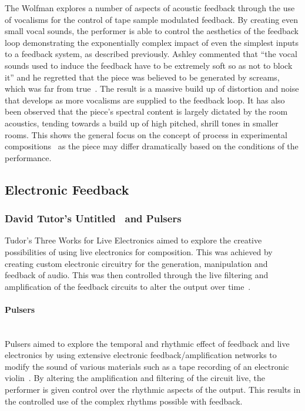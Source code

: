 \documentclass[titlepage]{scrartcl}
\begin{document}
    The Wolfman explores a number of aspects of acoustic feedback through the
    use of vocalisms for the control of tape sample modulated feedback. By
    creating even small vocal sounds, the performer is able to control the
    aesthetics of the feedback loop demonstrating the exponentially complex
    impact of even the simplest inputs to a feedback system, as described
    previously. Ashley commented that ``the vocal sounds used to induce the
    feedback have to be extremely soft so as not to block it'' and he regretted
    that the piece was believed to be generated by screams, which was far from
    true~\parencite[p.37]{gann2012ra}. The result is a massive build up of
    distortion and noise that develops as more vocalisms are supplied to the
    feedback loop. It has also been observed that the piece's spectral content
    is largely dictated by the room acoustics, tending towards a build up of
    high pitched, shrill tones in smaller rooms. This shows the general focus
    on the concept of process in experimental
    compositions~\parencite[p.18]{cage2011silence} as the piece may differ
    dramatically based on the conditions of the performance.

    \subsection{Electronic Feedback}\label{ElecFeed}
    \subsubsection{David Tutor's Untitled~\citeyearpar{tudor1996twfle} and Pulsers~\citeyearpar{tudor1996twfle}}\label{tudor}
    Tudor's Three Works for Live Electronics aimed to explore the creative
    possibilities of using live electronics for composition. This was achieved
    by creating custom electronic circuitry for the generation, manipulation
    and feedback of audio. This was then controlled through the live filtering
    and amplification of the feedback circuits to alter the output over
    time~\parencite[p.187]{holmes2012eaem}.
    
    \paragraph{Pulsers}\mbox{}\\
    Pulsers aimed to explore the temporal and rhythmic effect of feedback and
    live electronics by using extensive electronic feedback/amplification
    networks to modify the sound of various materials such as a tape recording
    of an electronic violin~\parencite{tudor1984twle}. By altering the amplification and filtering of the
    circuit live, the performer is given control over the rhythmic aspects of
    the output. This results in the controlled use of the complex rhythms
    possible with feedback.
    
\end{document}
